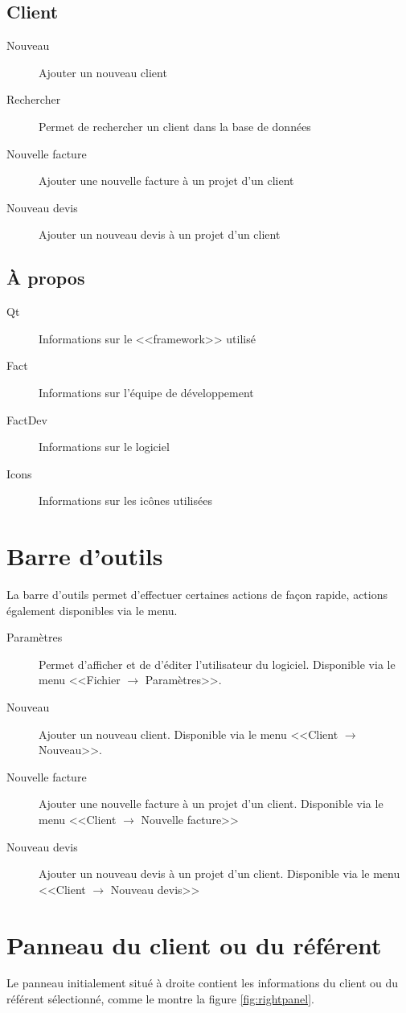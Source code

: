 \subsection{Client}
\begin{description}
	\item[Nouveau] Ajouter un nouveau client
	\item[Rechercher] Permet de rechercher un client dans la base de données
	\item[Nouvelle facture]  Ajouter une nouvelle facture à un projet d’un client
	\item[Nouveau devis] Ajouter un nouveau devis à un projet d’un client
\end{description}
\subsection{À propos}
\begin{description}
	\item[Qt] Informations sur le <<framework>> utilisé
	\item[Fact] Informations sur l'équipe de développement
	\item[FactDev]Informations sur le logiciel
	\item[Icons] Informations sur les icônes utilisées
\end{description}
\section{Barre d'outils}
La barre d’outils permet d’effectuer certaines actions de façon rapide, actions également disponibles via le menu.

\begin{description}
	\item[Paramètres] Permet d'afficher et de d’éditer l'utilisateur du logiciel. Disponible via le menu <<Fichier $\rightarrow$ Paramètres>>.
	\item[Nouveau] Ajouter un nouveau client. Disponible via le menu <<Client $\rightarrow$ Nouveau>>.
	\item[Nouvelle facture]  Ajouter une nouvelle facture à un projet d’un client. Disponible via le menu <<Client $\rightarrow$ Nouvelle facture>>
	\item[Nouveau devis] Ajouter un nouveau devis à un projet d’un client. Disponible via le menu <<Client $\rightarrow$ Nouveau devis>>
\end{description}

\section{Panneau du client ou du référent}
Le panneau initialement situé à droite contient les informations du client ou du référent sélectionné, comme le montre la figure
\ref{fig:rightpanel}.

